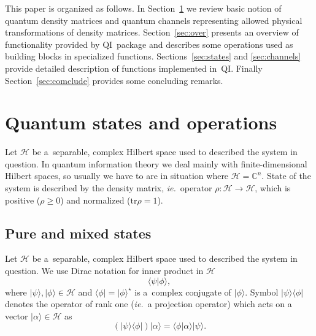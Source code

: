 \documentclass[final,5p,times]{elsarticle}
\newcommand{\ket}[1]{\ensuremath{|#1\rangle}}
\newcommand{\bra}[1]{\ensuremath{\langle#1|}}
\newcommand{\1}{{\rm 1\hspace{-0.9mm}l}}
\newcommand{\tr}{\mathrm{tr}}
\newcommand{\qi}{QI}
\newcommand{\HS}[1]{\ensuremath{\mathcal{#1}}} %
\newcommand{\Cplx}{\ensuremath{\mathbb{C}}}
\newcommand{\ie}{\emph{ie.}}
\newcommand{\iner}[2]{\braket{#1}{#2}}
\newcommand{\Iner}[2]{\iner{#1}{#2}}
\newcommand{\braket}[2]{\ensuremath{\langle#1|#2\rangle}}
\begin{document}
This paper is organized as follows. In Section~\ref{sec:qi-intro} we review
basic notion of quantum density matrices and quantum channels representing
allowed physical transformations of density matrices. Section~\ref{sec:over}
presents an overview of functionality provided by \qi\ package and describes
some operations used as building blocks in specialized functions.
Sections~\ref{sec:states} and \ref{sec:channels} provide detailed description of
functions implemented in~\qi. Finally Section~\ref{sec:comclude} provides some
concluding remarks.

\section{Quantum states and operations}\label{sec:qi-intro}
Let $\HS{H}$ be a~separable, complex Hilbert space used to described the system
in question. In quantum information theory we deal mainly with
finite-dimensional Hilbert spaces, so usually we have to are in situation where
$\HS{H}=\Cplx^n$. State of the system is described by the density matrix, \ie\
operator $\rho:\HS{H}\rightarrow\HS{H}$, which is positive ($\rho\geq0$) and
normalized ($\tr{\rho}=1$). 

\subsection{Pure and mixed states}
Let $\HS{H}$ be a~separable, complex Hilbert space\index{Hilbert space} used
to described the system in question. We use Dirac notation
\cite{dirac58principles} for inner product in $\HS{H}$
\begin{equation}
  \Iner{\psi}{\phi},
\label{eqn:dirac-iner}
\end{equation}
where $\ket{\psi},\ket{\phi}\in\HS{H}$ and $\bra{\phi} = \ket{\phi}^\star$ 
is a~complex conjugate of $\ket{\phi}$. Symbol $\ket{\psi}\bra{\phi}$ denotes
the operator of rank one (\ie\ a projection operator) which acts on a vector
$\ket{\alpha}\in\HS{H}$ as
\begin{equation}
\left(\ket{\psi}\bra{\phi}\right)\ket{\alpha} = \Iner{\phi}{\alpha}\ket{\psi}.
\label{eqn:dirac-proj}
\end{equation}
\end{document}
